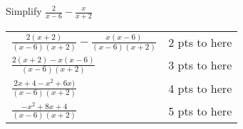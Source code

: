 
{
	Simplify $\displaystyle \frac{2}{x-6}-\frac{x}{x+2}$
}
{
	\begin{tabular}{l r}
	$\frac{2(x+2)}{(x-6)(x+2)} - \frac{x(x-6)}{(x-6)(x+2)}$ & 2 pts to here\\
	$\frac{2(x+2)-x(x-6)}{(x-6)(x+2)}$ & 3 pts to here\\
	$\frac{2x+4-x^2+6x)}{(x-6)(x+2)}$ & 4 pts to here\\
	$\frac{-x^2+8x+4}{(x-6)(x+2)}$ & 5 pts to here\\
	\end{tabular}
}
